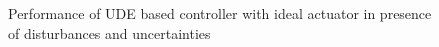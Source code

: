 \documentclass[conference]{IEEEtran}
\begin{document}
\begin{figure}[h]
\begin{center}
%
	\caption{Performance of UDE based controller with ideal actuator in presence of disturbances and uncertainties} 
\label{fig2}
\end{center}
\end{figure}
\end{document}
